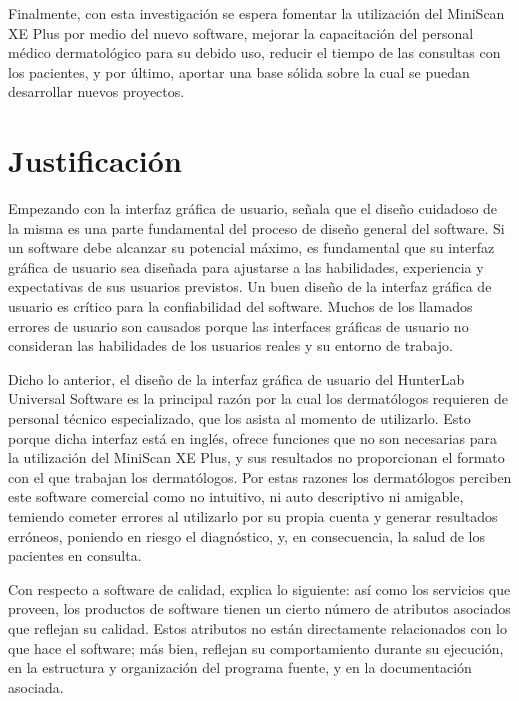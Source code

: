 Finalmente, con esta investigaci\'{o}n se espera fomentar la utilizaci\'{o}n del \mbox{MiniScan} XE Plus por medio del nuevo software, mejorar la capacitaci\'{o}n del personal m\'{e}dico dermatol\'{o}gico para su debido uso, reducir el tiempo de las consultas con los pacientes, y por \'{u}ltimo, aportar una base s\'{o}lida sobre la cual se puedan desarrollar nuevos proyectos.

	\section{Justificaci\'{o}n}
	
	Empezando con la interfaz gr\'{a}fica de usuario, \cite{Sommerville} se\~{n}ala que el dise\~{n}o cuidadoso de la misma es una parte fundamental del proceso de dise\~{n}o general del software. Si un software debe alcanzar su potencial m\'{a}ximo, es fundamental que su interfaz gr\'{a}fica de usuario sea dise\~{n}ada para ajustarse a las habilidades, experiencia y expectativas de sus usuarios previstos. Un buen dise\~{n}o de la interfaz gr\'{a}fica de usuario es cr\'{i}tico para la confiabilidad del software. Muchos de los llamados errores de usuario son causados porque las interfaces gr\'{a}ficas de usuario no consideran las habilidades de los usuarios reales y su entorno de trabajo.

	Dicho lo anterior, el dise\~{n}o de la interfaz gr\'{a}fica de usuario del HunterLab Universal Software es la principal raz\'{o}n por la cual los dermat\'{o}logos requieren de personal t\'{e}cnico especializado, que los asista al momento de utilizarlo. Esto porque dicha interfaz est\'{a} en ingl\'{e}s, ofrece funciones que no son necesarias para la utilizaci\'{o}n del MiniScan XE Plus, y sus resultados no proporcionan el formato con el que trabajan los dermat\'{o}logos. Por estas razones los dermat\'{o}logos perciben este software comercial como no intuitivo, ni auto descriptivo ni amigable, temiendo cometer errores al utilizarlo por su propia cuenta y generar resultados err\'{o}neos, poniendo en riesgo el diagn\'{o}stico, y, en consecuencia, la salud de los pacientes en consulta.

	Con respecto a software de calidad, \cite{Sommerville} explica lo siguiente: as\'{i} como los servicios que proveen, los productos de software tienen un cierto n\'{u}mero de atributos asociados que reflejan su calidad. Estos atributos no est\'{a}n directamente relacionados con lo que hace el software; m\'{a}s bien, reflejan su comportamiento durante su ejecuci\'{o}n, en la estructura y organizaci\'{o}n del programa fuente, y en la documentaci\'{o}n asociada.

